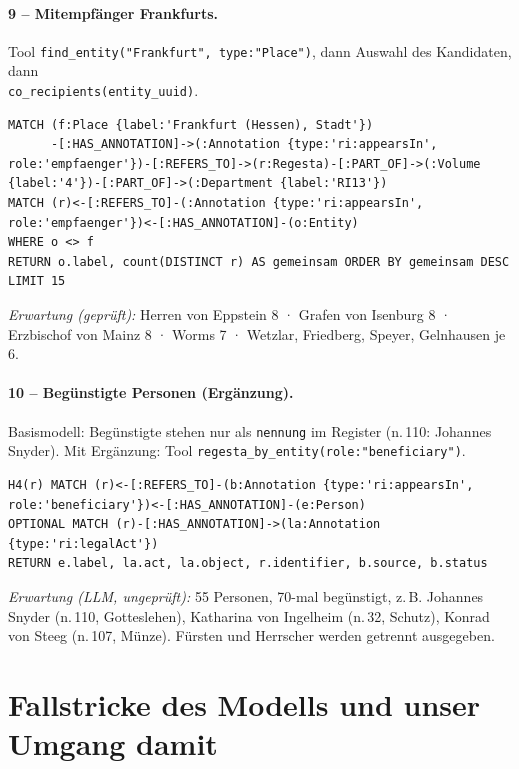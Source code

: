 \documentclass[10pt,a4paper]{article}
\newcommand{\code}[1]{\texttt{\small #1}}
\newcommand{\erg}{\textbf{Ergänzung}}
\begin{document}
\paragraph{9 -- Mitempfänger Frankfurts.}
Tool \code{find\_entity("Frankfurt", type:"Place")}, dann Auswahl des Kandidaten, dann\\ \code{co\_recipients(entity\_uuid)}.
\begin{lstlisting}
MATCH (f:Place {label:'Frankfurt (Hessen), Stadt'})
      -[:HAS_ANNOTATION]->(:Annotation {type:'ri:appearsIn', role:'empfaenger'})-[:REFERS_TO]->(r:Regesta)-[:PART_OF]->(:Volume {label:'4'})-[:PART_OF]->(:Department {label:'RI13'})
MATCH (r)<-[:REFERS_TO]-(:Annotation {type:'ri:appearsIn', role:'empfaenger'})<-[:HAS_ANNOTATION]-(o:Entity)
WHERE o <> f
RETURN o.label, count(DISTINCT r) AS gemeinsam ORDER BY gemeinsam DESC LIMIT 15
\end{lstlisting}
\emph{Erwartung (geprüft):} Herren von Eppstein 8 · Grafen von Isenburg 8 · Erzbischof von Mainz 8 · Worms 7 · Wetzlar, Friedberg, Speyer, Gelnhausen je 6.

\paragraph{10 -- Begünstigte Personen (\erg).}
Basismodell: Begünstigte stehen nur als \code{nennung} im Register (n.\,110: Johannes Snyder). Mit Ergänzung: Tool \code{regesta\_by\_entity(role:"beneficiary")}.
\begin{lstlisting}
H4(r) MATCH (r)<-[:REFERS_TO]-(b:Annotation {type:'ri:appearsIn', role:'beneficiary'})<-[:HAS_ANNOTATION]-(e:Person)
OPTIONAL MATCH (r)-[:HAS_ANNOTATION]->(la:Annotation {type:'ri:legalAct'})
RETURN e.label, la.act, la.object, r.identifier, b.source, b.status
\end{lstlisting}
\emph{Erwartung (LLM, ungeprüft):} 55 Personen, 70-mal begünstigt, z.\,B. Johannes Snyder (n.\,110, Gotteslehen), Katharina von Ingelheim (n.\,32, Schutz), Konrad von Steeg (n.\,107, Münze). Fürsten und Herrscher werden getrennt ausgegeben.

\section{Fallstricke des Modells und unser Umgang damit}
\end{document}
